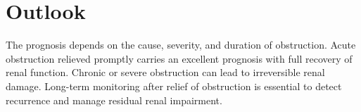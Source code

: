 \section{Outlook}
The prognosis depends on the cause, severity, and duration of obstruction. Acute obstruction relieved promptly carries an excellent prognosis with full recovery of renal function. Chronic or severe obstruction can lead to irreversible renal damage. Long-term monitoring after relief of obstruction is essential to detect recurrence and manage residual renal impairment.
